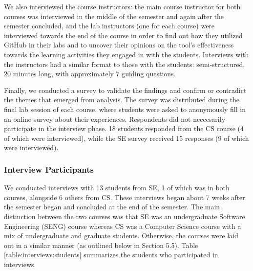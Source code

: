 We also interviewed the course instructors: the main course instructor for both courses was interviewed in the middle of the semester and again after the semester concluded, and the lab instructors (one for each course) were interviewed towards the end of the course in order to find out how they utilized GitHub in their labs and to uncover their opinions on the tool's effectiveness towards the learning activities they engaged in with the students. Interviews with the instructors had a similar format to those with the students: semi-structured, 20 minutes long, with approximately 7 guiding questions.

Finally, we conducted a survey to validate the findings and confirm or contradict the themes that emerged from analysis. The survey was distributed during the final lab session of each course, where students were asked to anonymously fill in an online survey about their experiences. Respondents did not neccesarily participate in the interview phase. 18 students responded from the CS course (4 of which were interviewed), while the SE survey received 15 responses (9 of which were interviewed).

\subsubsection{Interview Participants}
We conducted interviews with 13 students from SE, 1 of which was in both courses, alongside 6 others from CS. These interviews began about 7 weeks after the semester began and concluded at the end of the semester. The main distinction between the two courses was that SE was an undergraduate Software Engineering (SENG) course whereas CS was a Computer Science course with a mix of undergraduate and graduate students. Otherwise, the courses were laid out in a similar manner (as outlined below in Section 5.5). Table \ref{table:interviews:students} summarizes the students who participated in interviews.

